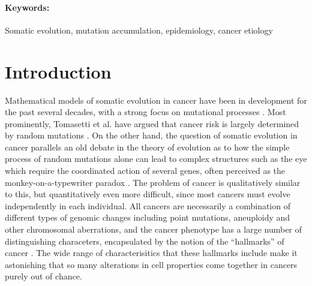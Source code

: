 \documentclass[12pt,onecolumn,twoside]{article}
\begin{document}
\paragraph{Keywords:} Somatic evolution, mutation accumulation, epidemiology, cancer etiology
\pagebreak
\section{Introduction}

Mathematical models of somatic evolution in cancer have been in development for the past several decades, with a strong focus on mutational processes \autocite{ARMITAGE1954, McFarland2013, Blokzijl2016, Mina2017}. Most prominently, Tomasetti et al. have argued that cancer risk is largely determined by random mutations \autocite{Tomasetti78, Tomasetti2017}. On the other hand, the question of somatic evolution in cancer parallels an old debate in the theory of evolution as to how the simple process of random mutations alone can lead to complex structures such as the eye which require the coordinated action of several genes, often perceived as the monkey-on-a-typewriter paradox \autocite{Dawkins1996}. The problem of cancer is qualitatively similar to this, but quantitatively even more difficult, since most cancers must evolve independently in each individual. All cancers are necessarily a combination of different types of genomic changes including point mutations, aneuploidy and other chromosomal aberrations, and the cancer phenotype has a large number of distinguishing characeters, encapsulated by the notion of the ``hallmarks'' of cancer \autocite{Hanahan2000, Schafer2008, Hanahan2011}. The wide range of characterisitics that these hallmarks include make it astonishing that so many alterations in cell properties come together in cancers purely out of chance.
\end{document}
